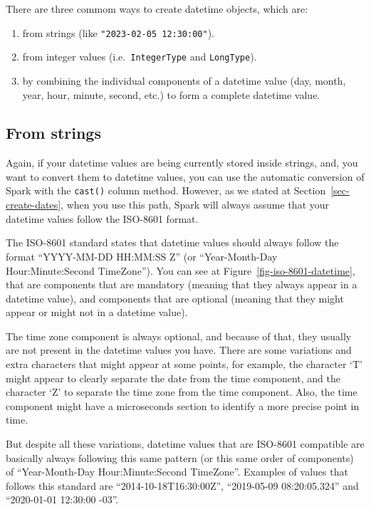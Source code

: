 \documentclass[
  11pt,
  letterpaper,
  DIV=11,
  numbers=noendperiod]{scrreprt}
\providecommand{\tightlist}{%
  \setlength{\itemsep}{0pt}\setlength{\parskip}{0pt}}\usepackage{longtable,booktabs,array}
\begin{document}
There are three commom ways to create datetime objects, which are:

\begin{enumerate}
\def\labelenumi{\arabic{enumi}.}
\tightlist
\item
  from strings (like \texttt{"2023-02-05\ 12:30:00"}).
\item
  from integer values (i.e.~\texttt{IntegerType} and \texttt{LongType}).
\item
  by combining the individual components of a datetime value (day,
  month, year, hour, minute, second, etc.) to form a complete datetime
  value.
\end{enumerate}

\subsection{From strings}\label{from-strings-1}

Again, if your datetime values are being currently stored inside
strings, and, you want to convert them to datetime values, you can use
the automatic conversion of Spark with the \texttt{cast()} column
method. However, as we stated at Section~\ref{sec-create-dates}, when
you use this path, Spark will always assume that your datetime values
follow the ISO-8601 format.

The ISO-8601 standard states that datetime values should always follow
the format ``YYYY-MM-DD HH:MM:SS Z'' (or ``Year-Month-Day
Hour:Minute:Second TimeZone''). You can see at
Figure~\ref{fig-iso-8601-datetime}, that are components that are
mandatory (meaning that they always appear in a datetime value), and
components that are optional (meaning that they might appear or might
not in a datetime value).

The time zone component is always optional, and because of that, they
usually are not present in the datetime values you have. There are some
variations and extra characters that might appear at some points, for
example, the character `T' might appear to clearly separate the date
from the time component, and the character `Z' to separate the time zone
from the time component. Also, the time component might have a
microseconds section to identify a more precise point in time.

But despite all these variations, datetime values that are ISO-8601
compatible are basically always following this same pattern (or this
same order of components) of ``Year-Month-Day Hour:Minute:Second
TimeZone''. Examples of values that follows this standard are
``2014-10-18T16:30:00Z'', ``2019-05-09 08:20:05.324'' and ``2020-01-01
12:30:00 -03''.
\end{document}
